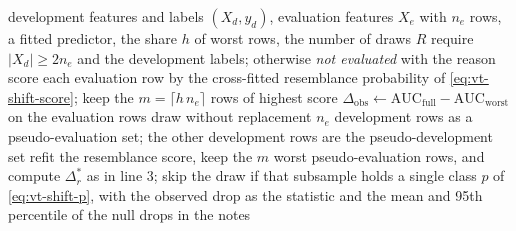 \begin{algorithm}[htbp]
\caption{The development-only reference of the shift-resilience test.}
\label{alg:vt-shift}
\begin{algorithmic}[1]
\Require development features and labels $(X_d,y_d)$, evaluation features $X_e$ with $n_e$ rows, a fitted predictor, the share $h$ of worst rows, the number of draws $R$
\State require $|X_d|\ge 2n_e$ and the development labels; otherwise \Return \emph{not evaluated} with the reason
\State score each evaluation row by the cross-fitted resemblance probability of \cref{eq:vt-shift-score}; keep the $m=\lceil h\,n_e\rceil$ rows of highest score
\State $\Delta_{\mathrm{obs}}\gets\mathrm{AUC}_{\mathrm{full}}-\mathrm{AUC}_{\mathrm{worst}}$ on the evaluation rows
  \State draw without replacement $n_e$ development rows as a pseudo-evaluation set; the other development rows are the pseudo-development set
  \State refit the resemblance score, keep the $m$ worst pseudo-evaluation rows, and compute $\Delta^{*}_r$ as in line 3; skip the draw if that subsample holds a single class
\EndFor
\State \Return $p$ of \cref{eq:vt-shift-p}, with the observed drop as the statistic and the mean and 95th percentile of the null drops in the notes
\end{algorithmic}
\end{algorithm}

